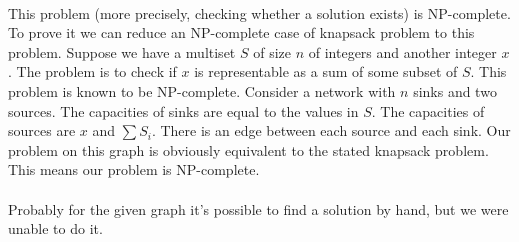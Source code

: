 \paragraph{}
This problem (more precisely, checking whether a solution exists) is NP-complete. To prove it we can reduce an NP-complete case of knapsack problem to this problem. Suppose we have a multiset $S$ of size $n$ of integers and another integer $x$. The problem is to check if $x$ is representable as a sum of some subset of $S$. This problem is known to be NP-complete. Consider a network with $n$ sinks and two sources. The capacities of sinks are equal to the values in $S$. The capacities of sources are $x$ and $\sum S_i$. There is an edge between each source and each sink. Our problem on this graph is obviously equivalent to the stated knapsack problem. This means our problem is NP-complete.

\paragraph{}
Probably for the given graph it's possible to find a solution by hand, but we were unable to do it.
